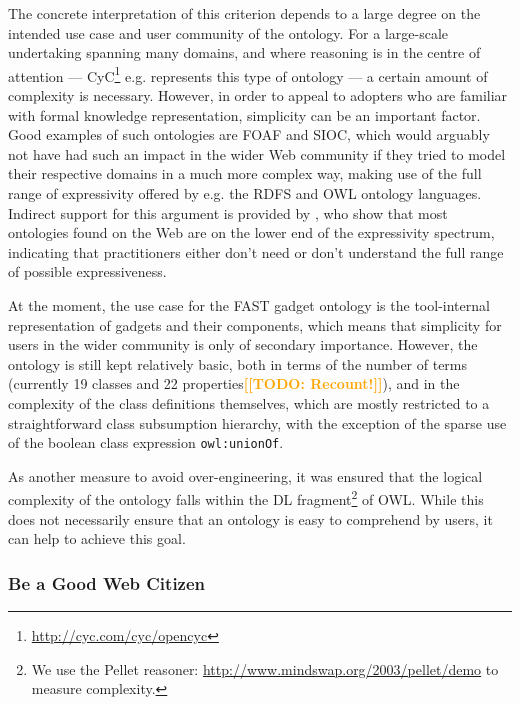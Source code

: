 \documentclass[twoside]{fast_latex}
\newcommand{\todo}[1]{\textsf{\textbf{\textcolor{Orange}{[[TODO: #1]]}}}}
\newcommand{\todo}[1]{}
\begin{document}
The concrete interpretation of this criterion depends to a large degree on the intended use case and user community of the ontology. For a large-scale undertaking spanning many domains, and where reasoning is in the centre of attention --- CyC\footnote{\url{http://cyc.com/cyc/opencyc}} e.g. represents this type of ontology  --- a certain amount of complexity is necessary. However, in order to appeal to adopters who are familiar with formal knowledge representation, simplicity can be an important factor. Good examples of such ontologies are FOAF and SIOC, which would arguably not have had such an impact in the wider Web community if they tried to model their respective domains in a much more complex way, making use of the full range of expressivity offered by e.g. the RDFS and OWL ontology languages. Indirect support for this argument is provided by \cite{wang2006owl_survey}, who show that most ontologies found on the Web are on the lower end of the expressivity spectrum, indicating that practitioners either don't need or don't understand the full range of possible expressiveness.

At the moment, the use case for the FAST gadget ontology is the tool-internal representation of gadgets and their components, which means that simplicity for users in the wider community is only of secondary importance. However, the ontology is still kept relatively basic, both in terms of the number of terms (currently 19 classes and 22 properties\todo{Recount!}), and in the complexity of the class definitions themselves, which are mostly restricted to a straightforward class subsumption hierarchy, with the exception of the sparse use of the boolean class expression \texttt{owl:unionOf}.

As another measure to avoid over-engineering, it was ensured that the logical complexity of the ontology falls within the DL fragment\footnote{We use the Pellet reasoner: \url{http://www.mindswap.org/2003/pellet/demo} to measure complexity.} of OWL. While this does not necessarily ensure that an ontology is easy to comprehend by users, it can help to achieve this goal.


\subsubsection{Be a Good Web Citizen} %
\label{ssub:be_a_good_web_citizen}
\end{document}
